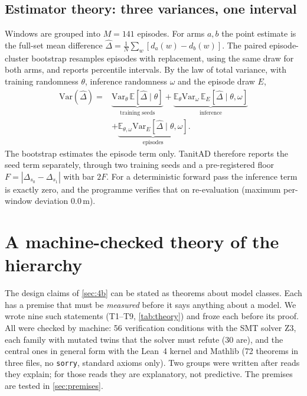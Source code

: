 \documentclass[10pt,twocolumn]{article}
\theoremstyle{remark}
\begin{document}
\subsection{Estimator theory: three variances, one interval}
Windows are grouped into $M=141$ episodes. For arms $a,b$ the point estimate is the full-set mean difference
$\hat\Delta=\frac1N\sum_w[d_a(w)-d_b(w)]$. The paired episode-cluster bootstrap resamples episodes with replacement, using the same
draw for both arms, and reports percentile intervals. By the law of total variance, with training randomness $\theta$, inference
randomness $\omega$ and the episode draw $E$,
\begin{equation}
\begin{aligned}
\mathrm{Var}(\hat\Delta)={}&\underbrace{\mathrm{Var}_\theta\,\mathbb E[\hat\Delta\mid\theta]}_{\text{training seeds}}+\underbrace{\mathbb E_\theta\mathrm{Var}_\omega\,\mathbb E_E[\hat\Delta\mid\theta,\omega]}_{\text{inference}}\\
&+\underbrace{\mathbb E_{\theta,\omega}\mathrm{Var}_E[\hat\Delta\mid\theta,\omega]}_{\text{episodes}} .
\end{aligned}
\end{equation}
The bootstrap estimates the episode term only. TanitAD therefore reports the seed term separately, through two training seeds and a
pre-registered floor $F=|\Delta_{s_0}-\Delta_{s_1}|$ with bar $2F$. For a deterministic forward pass the inference term is exactly zero,
and the programme verifies that on re-evaluation (maximum per-window deviation 0.0\,m).

\section{A machine-checked theory of the hierarchy}\label{sec:theory}
The design claims of \cref{sec:4b} can be stated as theorems about model classes. Each has a premise that must be \emph{measured}
before it says anything about a model. We wrote nine such statements (T1--T9, \cref{tab:theory}) and froze each before its proof.
All were checked by machine: 56 verification conditions with the SMT solver Z3, each family with mutated twins that the solver must
refute (30 are), and the central ones in general form with the Lean~4 kernel and Mathlib (72 theorems in three files, no \texttt{sorry}, standard
axioms only). Two groups were written after reads they explain; for those reads they are explanatory, not predictive. The premises
are tested in \cref{sec:premises}.
\end{document}
